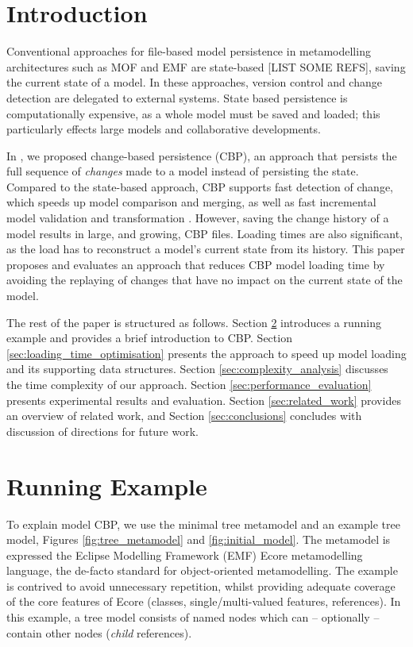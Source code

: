 \documentclass{llncs}
\begin{document}
    \section{Introduction}
    \label{sec:introduction}
    Conventional approaches for file-based model persistence in metamodelling architectures such as MOF and EMF are  state-based [LIST SOME REFS], saving the current state of a model.  In these approaches,  version control and change detection are delegated to external systems.  State based persistence is computationally expensive, as a whole model must be saved and loaded; this particularly effects large models and collaborative developments.
    
    In \cite{yohannis2017turning}, we proposed change-based persistence (CBP), an approach that persists the full sequence of \emph{changes} made to a model instead of persisting the state.  Compared to the state-based approach, CBP supports fast detection of change, which speeds up model comparison and merging, as well as fast incremental model validation and transformation \cite{rath2012derived,ogunyomi2015property}.
    However, saving the change history of a model results in large, and growing, CBP files.  Loading times are also significant, as the load has to reconstruct a model's current state from its history\cite{yohannis2017turning}.   This paper proposes and evaluates an approach that reduces CBP model loading time by avoiding the replaying of changes that have no impact on the current state of the model.
    
    The rest of the paper is structured as follows. Section \ref{sec:case_study} introduces a running example and provides a brief introduction to CBP.
    Section \ref{sec:loading_time_optimisation} presents the approach to speed up model loading and its supporting data structures. Section \ref{sec:complexity_analysis} discusses the time complexity of our approach. Section \ref{sec:performance_evaluation} presents experimental results and evaluation. Section \ref{sec:related_work} provides an overview of related work, and Section \ref{sec:conclusions} concludes with discussion of directions for future work.
    
    \section{Running Example}
    \label{sec:case_study}
    To explain model CBP, we use the minimal tree metamodel and an example tree model, Figures \ref{fig:tree_metamodel} and \ref{fig:initial_model}.
    The metamodel is expressed the Eclipse Modelling Framework (EMF) Ecore metamodelling language, the de-facto standard for object-oriented metamodelling.  The example is contrived to avoid unnecessary repetition, whilst providing adequate coverage of the core features of Ecore (classes, single/multi-valued features, references).
    In this example, a tree model consists of named nodes which can -- optionally -- contain other nodes (\emph{child} references).
    
\end{document}
